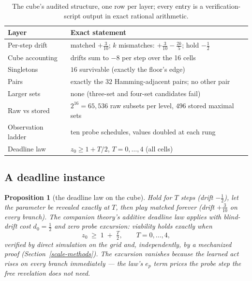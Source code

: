 \documentclass[10pt,twocolumn]{article}
\theoremstyle{plain}
\newtheorem{proposition}[theorem]{Proposition}
\theoremstyle{definition}
\theoremstyle{remark}
\begin{document}
\begin{table}[t]
\centering\footnotesize
\caption{The cube's audited structure, one row per layer; every entry is a
verification-script output in exact rational arithmetic.}
\label{scale-tab:glance}
\begin{tabular}{@{}l p{4.9cm}@{}}
\toprule
Layer & Exact statement \\
\midrule
Per-step drift & matched $+\tfrac3{10}$; $k$ mismatches: $+\tfrac3{10}-\tfrac{2k}{5}$; hold $-\tfrac12$ \\
Cube accounting & drifts sum to $-8$ per step over the 16 cells \\
Singletons & $16$ survivable (exactly the floor's edge) \\
Pairs & exactly the $32$ Hamming-adjacent pairs; no other pair \\
Larger sets & none (three-set and four-set candidates fail) \\
Raw vs stored & $2^{16} = 65{,}536$ raw subsets per level, $496$ stored maximal sets \\
Observation ladder & ten probe schedules, values doubled at each rung \\
Deadline law & $z_0 \ge 1 + T/2$, $T = 0, \dots, 4$ (all cells) \\
\bottomrule
\end{tabular}
\end{table}

\subsection{A deadline instance}\label{scale-deadline}

\begin{proposition}[the deadline law on the cube]\label{scale-prop:deadline}
Hold for \(T\) steps (drift \(-\tfrac12\)), let the parameter be
revealed exactly at \(T\), then play matched forever (drift
\(+\tfrac3{10}\) on every branch). The companion theory's additive
deadline law applies with blind-drift cost \(d_{0} = \tfrac12\) and
zero probe excursion: viability holds exactly when
\[
z_{0} \;\ge\; 1 \;+\; \tfrac{T}{2}, \qquad T = 0, \dots, 4,
\]
verified by direct simulation on the grid and, independently, by a
mechanized proof (Section~\ref{scale-methods}). The excursion vanishes
because the learned act rises on every branch immediately --- the
law's \(e_{p}\) term prices the probe step the free revelation does
not need.
\end{proposition}
\end{document}
